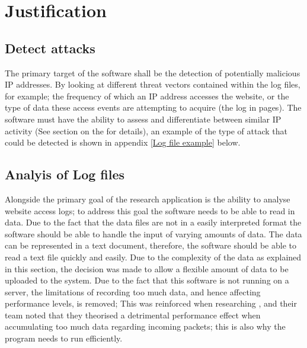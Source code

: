 \section{Justification}

\subsection*{Detect attacks}
The primary target of the software shall be the detection of potentially malicious IP addresses. By looking at different threat vectors contained within the log files, for example; the frequency of which an IP address accesses the website, or the type of data these access events are attempting to acquire (the log in pages). The software must have the ability to assess and differentiate between similar IP activity (See section on the  for details), an example of the type of attack that could be detected is shown in appendix \ref{Log file example} below.

\subsection*{Analyis of Log files}
Alongside the primary goal of the research application is the ability to analyse website access logs; to address this goal the software needs to be able to read in data. Due to the fact that the data files are not in a easily interpreted format the software should be able to handle the input of varying amounts of data. The data can be represented in a text document, therefore, the software should be able to read a text file quickly and easily. Due to the complexity of the data as explained in this section, the decision was made to allow a flexible amount of data to be uploaded to the system. Due to the fact that this software is not running on a server, the limitations of recording too much data, and hence affecting performance levels, is removed; This was reinforced when researching \cite{staniford2002practical}, and their team noted that they theorised a detrimental performance effect when accumulating too much data regarding incoming packets; this is also why the program needs to run efficiently.

